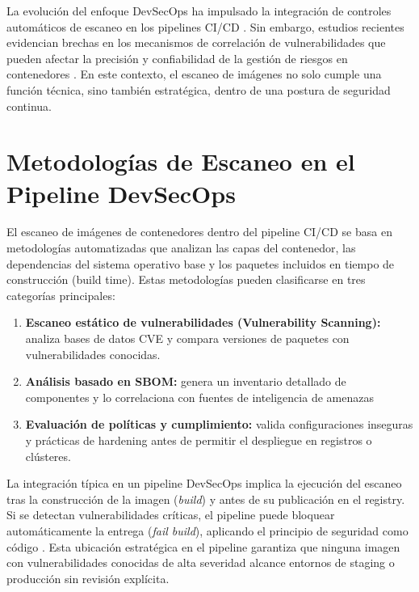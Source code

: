 \documentclass[journal]{IEEEtran}
\begin{document}
La evolución del enfoque DevSecOps ha impulsado la integración de controles automáticos de escaneo en los pipelines CI/CD \cite{ref2}. Sin embargo, estudios recientes evidencian brechas en los mecanismos de correlación de vulnerabilidades que pueden afectar la precisión y confiabilidad de la gestión de riesgos en contenedores \cite{ref1,ref3}. En este contexto, el escaneo de imágenes no solo cumple una función técnica, sino también estratégica, dentro de una postura de seguridad continua.

\section{Metodologías de Escaneo en el Pipeline DevSecOps}

El escaneo de imágenes de contenedores dentro del pipeline CI/CD se basa en metodologías automatizadas que analizan las capas del contenedor, las dependencias del sistema operativo base y los paquetes incluidos en tiempo de construcción (build time). Estas metodologías pueden clasificarse en tres categorías principales:

\begin{enumerate}
    \item \textbf{Escaneo estático de vulnerabilidades (Vulnerability Scanning):} analiza bases de datos CVE y compara versiones de paquetes con vulnerabilidades conocidas.

    \item \textbf{Análisis basado en SBOM:} genera un inventario detallado de componentes y lo correlaciona con fuentes de inteligencia de amenazas \cite{ref1,ref3}

    \item \textbf{Evaluación de políticas y cumplimiento:} valida configuraciones inseguras y prácticas de hardening antes de permitir el despliegue en registros o clústeres.
\end{enumerate}

La integración típica en un pipeline DevSecOps implica la ejecución del escaneo tras la construcción de la imagen (\textit{build}) y antes de su publicación en el registry. Si se detectan vulnerabilidades críticas, el pipeline puede bloquear automáticamente la entrega (\textit{fail build}), aplicando el principio de seguridad como código \cite{ref2}. Esta ubicación estratégica en el pipeline garantiza que ninguna imagen con vulnerabilidades conocidas de alta severidad alcance entornos de staging o producción sin revisión explícita.
\end{document}
